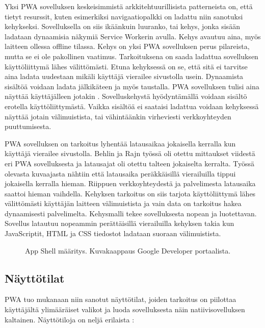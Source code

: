 \documentclass{tktltiki}
\begin{document}
Yksi PWA sovelluksen keskeisimmistä arkkitehtuurillisista patterneista on, että tietyt resurssit, kuten esimerkiksi navigaatiopalkki on ladattu niin sanotuksi kehykseksi. \cite{8441701} Sovelluksella on siis ikäänkuin luuranko, tai kehys, jonka sisään ladataan dynaamisia näkymiä Service Workerin avulla. Kehys avautuu aina, myös laitteen ollessa offline tilassa. Kehys on yksi PWA sovelluksen perus pilareista, mutta se ei ole pakollinen vaatimus. Tarkoituksena on saada ladattua sovelluksen käyttöliittymä lähes välittömästi. Etuna kehyksessä on se, että sitä ei tarvitse aina ladata uudestaan mikäli käyttäjä vierailee sivustolla usein. Dynaamista sisältöä voidaan ladata jälkikäteen ja myös taustalla. PWA sovelluksen tulisi aina näyttää käyttäjälleen jotakin \cite{von2018progressive}. Sovelluskehystä hyödyntämällä voidaan sisältö erotella käyttöliittymästä. Vaikka sisältöä ei saataisi ladattua voidaan kehyksessä näyttää jotain välimuistista, tai vähintäänkin virheviesti verkkoyhteyden puuttumisesta.

PWA sovelluksen on tarkoitus lyhentää latausaikaa jokaisella kerralla kun käyttäjä vierailee sivustolla. Behlin ja Rajn työssä \cite{8441701} oli otettu mittaukset viidestä eri PWA sovelluksesta ja latausajat oli otettu talteen jokaiselta kerralta. Työssä olevasta kuvaajasta nähtiin että latausaika peräkkäisillä vierailuilla tippui jokaisella kerralla hieman. Riippuen verkkoyhteydestä ja palvelimesta latausaika saattoi hieman vaihdella. Kehyksen tarkoitus on siis tarjota käyttöliittymä lähes välittömästi käyttäjän laitteen välimuistista ja vain data on tarkoitus hakea dynaamisesti palvelimelta. Kehysmalli tekee sovelluksesta nopean ja luotettavan. Sovellus latautuu nopeammin perättäisillä vierailuilla kehyksen takia kun JavaScriptit, HTML ja CSS tiedostot ladataan suoraan välimuistista.

\begin{figure}[h]
\begin{center}
\caption{App Shell määritys. Kuvakaappaus Google Developer portaalista. }
\label{App shell}
\end{center}
\end{figure}
\clearpage


\subsection{Näyttötilat}

PWA tuo mukanaan niin sanotut näyttötilat, joiden tarkoitus on piilottaa käyttäjältä ylimääräiset valikot ja luoda sovelluksesta näin natiivisovelluksen kaltainen. Näyttötiloja on neljä erilaista \cite{Mozilla}:
\end{document}
